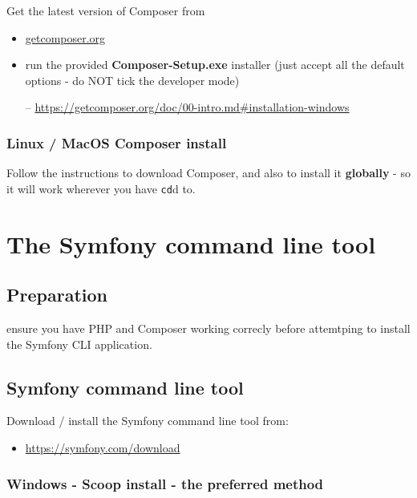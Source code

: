 \documentclass[a4paperpaper,openright]{book}
\providecommand{\tightlist}{%
  \setlength{\itemsep}{0pt}\setlength{\parskip}{0pt}}
\begin{document}
Get the latest version of Composer from

\begin{itemize}
\item
  \href{https://getcomposer.org/}{getcomposer.org}
\item
  run the provided \textbf{Composer-Setup.exe} installer (just accept
  all the default options - do NOT tick the developer mode)

  -- \url{https://getcomposer.org/doc/00-intro.md\#installation-windows}
\end{itemize}

\hypertarget{linux-macos-composer-install}{%
\subsection{Linux / MacOS Composer
install}\label{linux-macos-composer-install}}

Follow the instructions to download Composer, and also to install it
\textbf{globally} - so it will work wherever you have \texttt{cd}d to.

\hypertarget{the-symfony-command-line-tool}{%
\chapter{\texorpdfstring{The Symfony command line
tool\label{symfony_clis}}{The Symfony command line tool}}\label{the-symfony-command-line-tool}}

\hypertarget{preparation-2}{%
\section{Preparation}\label{preparation-2}}

ensure you have PHP and Composer working correcly before attemtping to
install the Symfony CLI application.

\hypertarget{symfony-command-line-tool}{%
\section{Symfony command line tool}\label{symfony-command-line-tool}}

Download / install the Symfony command line tool from:

\begin{itemize}
\tightlist
\item
  \url{https://symfony.com/download}
\end{itemize}

\hypertarget{windows---scoop-install---the-preferred-method}{%
\subsection{Windows - Scoop install - the preferred
method}\label{windows---scoop-install---the-preferred-method}}
\end{document}
